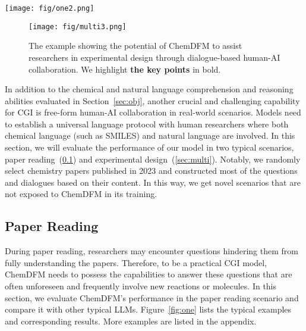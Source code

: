 \begin{figure*}[t]
    \centering
    \texttt{[image: fig/one2.png]}
    \caption{The examples of paper reading scenario. We mark \textcolor{green}{correct and relevant information} in the replies in green, \textcolor{yellow}{the correct but irrelevant information} in yellow, and \textcolor{red}{the wrong information} in red. In addition, \textbf{the key points of the answer} are marked in bold if they appear in the reply. Due to space constraints, some content has been omitted~([...] in the paragraphs). Please refer to the appendix to find the full replies.}
    \label{fig:one}
    \vspace{-3mm}
\end{figure*}

\begin{figure}[t]
    \centering
    \texttt{[image: fig/multi3.png]}
    \caption{The example showing the potential of ChemDFM to assist researchers in experimental design through dialogue-based human-AI collaboration. We highlight \textbf{the key points} in bold.}
    \label{fig:multi}
    \vspace{-3mm}
\end{figure}

In addition to the chemical and natural language comprehension and reasoning abilities evaluated in Section~\cref{sec:obj}, another crucial and challenging capability for CGI is free-form human-AI collaboration in real-world scenarios. Models need to establish a universal language protocol with human researchers where both chemical language (such as SMILES) and natural language are involved.  In this section, we will evaluate the performance of our model in two typical scenarios, paper reading~(\cref{sec:one}) and experimental design~(\cref{sec:multi}). Notably, we randomly select chemistry papers published in 2023 and constructed most of the questions and dialogues based on their content. In this way, we get novel scenarios that are not exposed to ChemDFM in its training.

\subsection{Paper Reading}\label{sec:one}

During paper reading, researchers may encounter questions hindering them from fully understanding the papers. Therefore, to be a practical CGI model, ChemDFM needs to possess the capabilities to answer these questions that are often unforeseen and frequently involve new reactions or molecules. In this section, we evaluate ChemDFM's performance in the paper reading scenario and compare it with other typical LLMs. Figure~\ref{fig:one} lists the typical examples and corresponding results.
More examples are listed in the appendix.

